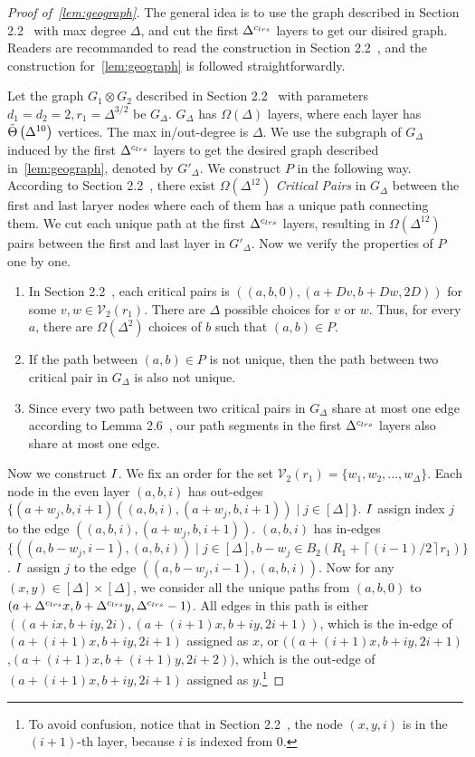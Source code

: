 \begin{proof}[Proof of~\cref{lem:geograph}]
	The general idea is to use the graph described in Section 2.2~\cite{HuangP21} with max degree $\Delta$, and cut the first $\Delta^{{c_{lrs}}{}}$ layers to get our disired graph. Readers are recommanded to read the construction in Section 2.2~\cite{HuangP21}, and the construction for~\cref{lem:geograph} is followed straightforwardly. 
	
	Let the graph $G_1\otimes G_2$ described in Section 2.2~\cite{HuangP21} with parameters $d_1=d_2=2,r_1=\Delta^{3/2}$ be $G_{\Delta}$. $G_{\Delta}$ has $\Omega(\Delta)$ layers, where each layer has $\tilde{\Theta}\left(\Delta^{10}\right)$ vertices. The max in/out-degree is $\Delta$. We use the subgraph of $G_{\Delta}$ induced by the first $\Delta^{{c_{lrs}}{}}$ layers
	to get the desired graph described in~\cref{lem:geograph}, denoted by $G'_{\Delta}$. %
	We construct $P$ in the following way. According to Section 2.2~\cite{HuangP21}, there exist $\Omega(\Delta^{12})$ \emph{Critical Pairs} in $G_{\Delta}$ between the first and last laryer nodes where each of them has a unique path connecting them. We cut each unique path at the first $\Delta^{{c_{lrs}}{}}$ layers, resulting in $\Omega(\Delta^{12})$ pairs between the first and last layer in $G'_{\Delta}$. %
	Now we verify the properties of $P$ one by one.
	\begin{enumerate}
		\item In Section 2.2~\cite{HuangP21}, each critical pairs is $((a,b,0),(a+Dv,b+Dw,2D))$ for some $v,w\in\mathcal{V}_2(r_1)$. There are $\Delta$ possible choices for $v$ or $w$. Thus, for every $a$, there are $\Omega(\Delta^2)$ choices of $b$ such that $(a,b)\in P$.
		\item If the path between $(a,b)\in P$ is not unique, then the path between two critical pair in $G_{\Delta}$ is also not unique.
		\item Since every two path between two critical pairs in $G_\Delta$ share at most one edge according to Lemma 2.6~\cite{HuangP21}, our path segments in the first $\Delta^{{c_{lrs}}{}}$ layers also share at most one edge.
	\end{enumerate}

        Now we construct $I{}$. We fix an order for the set $\mathcal{V}_2(r_1)=\{w_1,w_2,...,w_\Delta\}$. Each node in the even layer $(a,b,i)$ has out-edges $\{(a+w_j,b,i+1)\left((a,b,i),(a+w_j,b,i+1)\right)\mid j\in[\Delta]\}$. $I{}$ assign index $j$ to the edge $\left((a,b,i),(a+w_j,b,i+1)\right)$. $(a,b,i)$ has in-edges $\{\left((a,b-w_j,i-1),(a,b,i)\right)\mid j\in[\Delta],b-w_j\in B_2(R_1+\left\lceil (i-1)/2\right\rceil r_1)\}$. $I{}$ assign $j$ to the edge $\left((a,b-w_j,i-1),(a,b,i)\right)$. Now for any $(x,y)\in[\Delta]\times[\Delta]$, we consider all the unique paths from $(a,b,0)$ to $(a+\Delta^{{c_{lrs}}{}}x,b+\Delta^{{c_{lrs}}{}}y,\Delta^{{c_{lrs}}{}}-1)$. All edges in this path is either $\left((a+ix,b+iy,2i),(a+(i+1)x,b+iy,2i+1)\right)$, which is the in-edge of $(a+(i+1)x,b+iy,2i+1)$ assigned as $x$, or $((a+(i+1)x,b+iy,2i+1)$,$(a+(i+1)x,b+(i+1)y,2i+2))$, which is the out-edge of $(a+(i+1)x,b+iy,2i+1)$ assigned as $y$.\footnote{To avoid confusion, notice that in Section 2.2~\cite{HuangP21}, the node $(x,y,i)$ is in the $(i+1)$-th layer, because $i$ is indexed from $0$. }
\end{proof}
